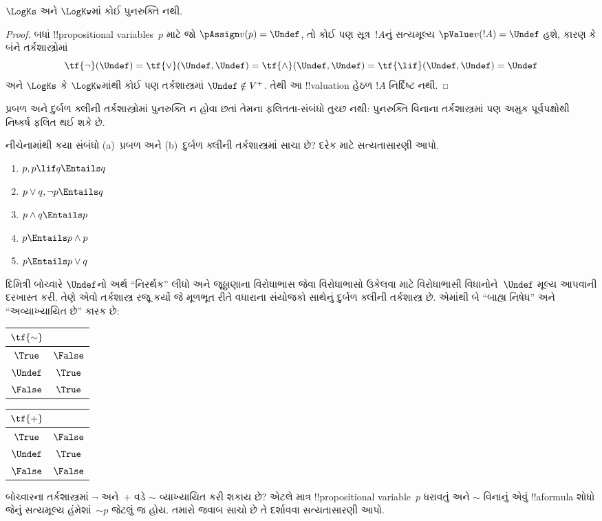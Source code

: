 \documentclass[../../../include/open-logic-section]{subfiles}
\begin{document}
\begin{prop}
  $\LogKs$ અને $\LogKw$માં કોઈ પુનરુક્તિ નથી.
\end{prop}

\begin{proof}
  બધાં !!{propositional variable}s~$p$ માટે જો
  $\pAssign v(p) = \Undef$, તો કોઈ પણ સૂત્ર~$!A$નું સત્યમૂલ્ય
  $\pValue v(!A) = \Undef$ હશે, કારણ કે બંને તર્કશાસ્ત્રોમાં
  \[
    \tf{\lnot}(\Undef) = \tf{\lor}(\Undef, \Undef) = \tf{\land}(\Undef,
  \Undef) = \tf{\lif}(\Undef, \Undef) = \Undef
  \]
  અને $\LogKs$ કે $\LogKw$માંથી કોઈ પણ તર્કશાસ્ત્રમાં
  $\Undef \notin V^+$.
  તેથી આ !!{valuation} હેઠળ $!A$ નિર્દિષ્ટ નથી.
\end{proof}

પ્રબળ અને દુર્બળ ક્લીની તર્કશાસ્ત્રોમાં પુનરુક્તિ ન હોવા છતાં
તેમના ફલિતતા-સંબંધો તુચ્છ નથી: પુનરુક્તિ વિનાના
તર્કશાસ્ત્રમાં પણ અમુક પૂર્વપક્ષોથી નિષ્કર્ષ ફલિત થઈ શકે છે.

\begin{prob}
  નીચેનામાંથી કયા સંબંધો (a)~પ્રબળ અને (b)~દુર્બળ ક્લીની
  તર્કશાસ્ત્રમાં સાચા છે? દરેક માટે સત્યતાસારણી આપો.
  \begin{enumerate}
    \item $p, p \lif q \Entails q$
    \item $p \lor q, \lnot p \Entails q$
    \item $p \land q \Entails p$
    \item $p \Entails p \land p$
    \item $p \Entails p \lor q$
  \end{enumerate}
\end{prob}

દિમિત્રી બોચ્વારે $\Undef$નો અર્થ ``નિરર્થક'' લીધો અને
જૂઠ્ઠાણાના વિરોધાભાસ જેવા વિરોધાભાસો ઉકેલવા માટે વિરોધાભાસી
વિધાનોને~$\Undef$ મૂલ્ય આપવાની દરખાસ્ત કરી. તેણે એવો તર્કશાસ્ત્ર
રજૂ કર્યો જે મૂળભૂત રીતે વધારાના સંયોજકો સાથેનું દુર્બળ ક્લીની
તર્કશાસ્ત્ર છે. એમાંથી બે ``બાહ્ય નિષેધ'' અને ``અવ્યાખ્યાયિત છે''
કારક છે:
\begin{center}
  \begin{tabular}{c|c}
    $\tf{\sim}$ & \\
    \hline
    $\True$ & $\False$ \\
    $\Undef$ & $\True$ \\
    $\False$ & $\True$
  \end{tabular}
\quad
  \begin{tabular}{c|c}
    $\tf{+}$ & \\
    \hline
    $\True$ & $\False$ \\
    $\Undef$ & $\True$ \\
    $\False$ & $\False$
  \end{tabular}
\end{center}

\begin{prob}
  બોચ્વારના તર્કશાસ્ત્રમાં $\lnot$ અને~$+$ વડે $\sim$ વ્યાખ્યાયિત
  કરી શકાય છે? એટલે માત્ર !!{propositional
  variable}~$p$ ધરાવતું અને $\sim$ વિનાનું એવું !!a{formula}
  શોધો જેનું સત્યમૂલ્ય હંમેશાં~$\mathord{\sim}p$ જેટલું જ હોય.
  તમારો જવાબ સાચો છે તે દર્શાવવા સત્યતાસારણી આપો.
\end{prob}
\end{document}

